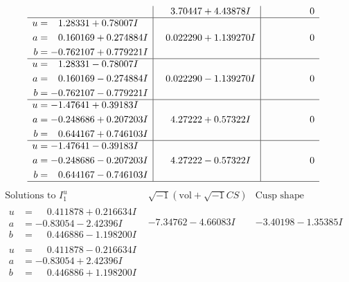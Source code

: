 \documentclass[1p]{elsarticle_modified}
\theoremstyle{definition}
\newcommand{\I}{\sqrt{-1}}
\begin{document}
$$\begin{array}{c|c|c}
 & \phantom{-}3.70447 + 4.43878 I & \phantom{-0.000000 } 0 \\ \hline\begin{aligned}
u &= \phantom{-}1.28331 + 0.78007 I \\
a &= \phantom{-}0.160169 + 0.274884 I \\
b &= -0.762107 + 0.779221 I\end{aligned}
 & \phantom{-}0.022290 + 1.139270 I & \phantom{-0.000000 } 0 \\ \hline\begin{aligned}
u &= \phantom{-}1.28331 - 0.78007 I \\
a &= \phantom{-}0.160169 - 0.274884 I \\
b &= -0.762107 - 0.779221 I\end{aligned}
 & \phantom{-}0.022290 - 1.139270 I & \phantom{-0.000000 } 0 \\ \hline\begin{aligned}
u &= -1.47641 + 0.39183 I \\
a &= -0.248686 + 0.207203 I \\
b &= \phantom{-}0.644167 + 0.746103 I\end{aligned}
 & \phantom{-}4.27222 + 0.57322 I & \phantom{-0.000000 } 0 \\ \hline\begin{aligned}
u &= -1.47641 - 0.39183 I \\
a &= -0.248686 - 0.207203 I \\
b &= \phantom{-}0.644167 - 0.746103 I\end{aligned}
 & \phantom{-}4.27222 - 0.57322 I & \phantom{-0.000000 } 0\\
 \hline 
 \end{array}$$\newpage$$\begin{array}{c|c|c}  
\text{Solutions to }I^u_{1}& \I (\text{vol} + \sqrt{-1}CS) & \text{Cusp shape}\\
 \hline 
\begin{aligned}
u &= \phantom{-}0.411878 + 0.216634 I \\
a &= -0.83054 - 2.42396 I \\
b &= \phantom{-}0.446886 - 1.198200 I\end{aligned}
 & -7.34762 - 4.66083 I & -3.40198 - 1.35385 I \\ \hline\begin{aligned}
u &= \phantom{-}0.411878 - 0.216634 I \\
a &= -0.83054 + 2.42396 I \\
b &= \phantom{-}0.446886 + 1.198200 I\end{aligned}

\end{array}$$
\end{document}
